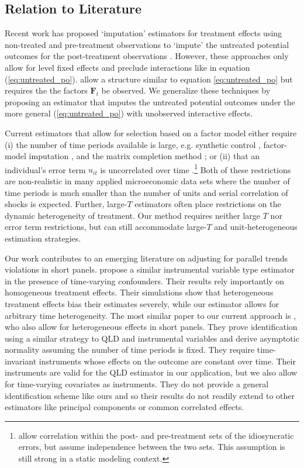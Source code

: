 \documentclass[12pt]{article}
\begin{document}
\subsection*{Relation to Literature}

Recent work has proposed `imputation' estimators for treatment effects using non-treated and pre-treatment observations to `impute' the untreated potential outcomes for the post-treatment observations \citep[e.g.][]{Borusyak_Jaravel_Spiess_2021,Gardner_2021,Wooldridge_2021}. However, these approaches only allow for level fixed effects and preclude interactions like in equation (\ref{eq:untreated_po}). \citet{Borusyak_Jaravel_Spiess_2021} allow a structure similar to equation \eqref{eq:untreated_po} but requires the the factors $\bm{F}_t$ be observed. We generalize these techniques by proposing an estimator that imputes the untreated potential outcomes under the more general (\ref{eq:untreated_po}) with unobserved interactive effects.

Current estimators that allow for selection based on a factor model either require (i) the number of time periods available is large, e.g. synthetic control \citep{abadie2021using}, factor-model imputation \citep{Xu_2017,Gobillon_Magnac_2016}, and the matrix completion method  \citep{Athey_et_al_2021,fernandez2021low}; or (ii) that an individual's error term $u_{it}$ is uncorrelated over time \citep{Imbens_Kallus_Mao_2021}.\footnote{\citet{Imbens_Kallus_Mao_2021} allow correlation within the post- and pre-treatment sets of the idiosyncratic errors, but assume independence between the two sets. This assumption is still strong in a static modeling context.} Both of these restrictions are non-realistic in many applied microeconomic data sets where the number of time periods is much smaller than the number of units and serial correlation of shocks is expected. Further, large-$T$ estimators often place restrictions on the dynamic heterogeneity of treatment. Our method requires neither large $T$ nor error term restrictions, but can still accommodate large-$T$ and unit-heterogeneous estimation strategies.

Our work contributes to an emerging literature on adjusting for parallel trends violations in short panels. \citet{freyaldenhoven2019pre} propose a similar instrumental variable type estimator in the presence of time-varying confounders. Their results rely importantly on homogeneous treatment effects. Their simulations show that heterogeneous treatment effects bias their estimates severely, while our estimator allows for arbitrary time heterogeneity. The most similar paper to our current approach is \citet{Callaway_Karami_2020}, who also allow for heterogeneous effects in short panels. They prove identification using a similar strategy to QLD and instrumental variables and derive asymptotic normality assuming the number of time periods is fixed. They require time-invariant instruments whose effects on the outcome are constant over time. Their instruments are valid for the QLD estimator in our application, but we also allow for time-varying covariates as instruments. They do not provide a general identification scheme like ours and so their results do not readily extend to other estimators like principal components or common correlated effects.
\end{document}
